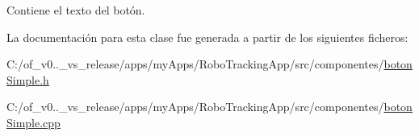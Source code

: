 Contiene el texto del botón. 



La documentación para esta clase fue generada a partir de los siguientes ficheros\+:\begin{DoxyCompactItemize}
\item 
C\+:/of\+\_\+v0..\+\_\+vs\+\_\+release/apps/my\+Apps/\+Robo\+Tracking\+App/src/componentes/\hyperlink{boton_simple_8h}{boton\+Simple.\+h}\item 
C\+:/of\+\_\+v0..\+\_\+vs\+\_\+release/apps/my\+Apps/\+Robo\+Tracking\+App/src/componentes/\hyperlink{boton_simple_8cpp}{boton\+Simple.\+cpp}\end{DoxyCompactItemize}
